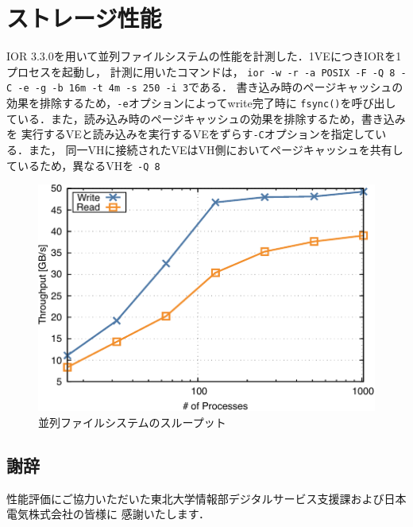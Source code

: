 ﻿\documentclass[submit,techrep,noauthor]{ipsj}
\begin{document}
\section{ストレージ性能}

IOR 3.3.0を用いて並列ファイルシステムの性能を計測した．1VEにつきIORを1プロセスを起動し，
計測に用いたコマンドは，
\texttt{ior -w -r -a POSIX -F -Q 8 -C -e -g -b 16m -t 4m -s 250 -i 3}である．
書き込み時のページキャッシュの効果を排除するため，\texttt{-e}オプションによってwrite完了時に
\texttt{fsync()}を呼び出している．また，読み込み時のページキャッシュの効果を排除するため，書き込みを
実行するVEと読み込みを実行するVEをずらす\texttt{-C}オプションを指定している．また，
同一VHに接続されたVEはVH側においてページキャッシュを共有しているため，異なるVHを
\texttt{-Q 8}

\begin{figure}
  \centering
  \includegraphics{figs/ior.pdf}
  \caption{並列ファイルシステムのスループット}\label{fig:ior}
\end{figure}

\subsection*{謝辞}

性能評価にご協力いただいた東北大学情報部デジタルサービス支援課および日本電気株式会社の皆様に
感謝いたします．



\end{document}
